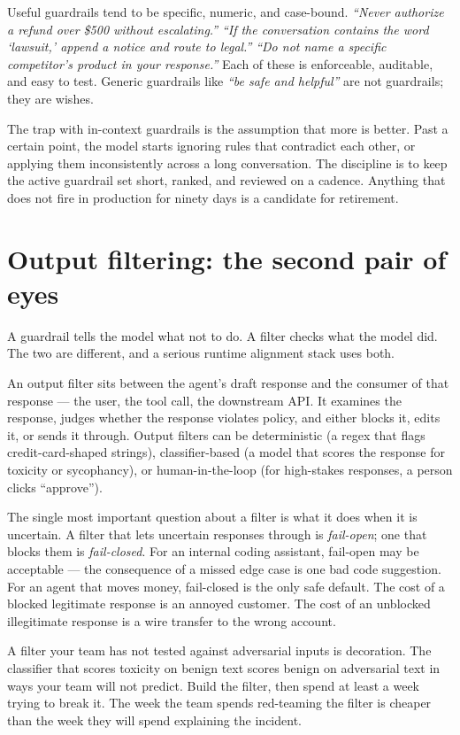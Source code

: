 Useful guardrails tend to be specific, numeric, and case-bound. \textit{``Never authorize a refund over \$500 without escalating.''} \textit{``If the conversation contains the word `lawsuit,' append a notice and route to legal.''} \textit{``Do not name a specific competitor's product in your response.''} Each of these is enforceable, auditable, and easy to test. Generic guardrails like \textit{``be safe and helpful''} are not guardrails; they are wishes.

The trap with in-context guardrails is the assumption that more is better. Past a certain point, the model starts ignoring rules that contradict each other, or applying them inconsistently across a long conversation. The discipline is to keep the active guardrail set short, ranked, and reviewed on a cadence. Anything that does not fire in production for ninety days is a candidate for retirement.

\section{Output filtering: the second pair of eyes}

A guardrail tells the model what not to do. A filter checks what the model did. The two are different, and a serious runtime alignment stack uses both.

An output filter sits between the agent's draft response and the consumer of that response --- the user, the tool call, the downstream API. It examines the response, judges whether the response violates policy, and either blocks it, edits it, or sends it through. Output filters can be deterministic (a regex that flags credit-card-shaped strings), classifier-based (a model that scores the response for toxicity or sycophancy), or human-in-the-loop (for high-stakes responses, a person clicks ``approve'').

The single most important question about a filter is what it does when it is uncertain. A filter that lets uncertain responses through is \textit{fail-open}; one that blocks them is \textit{fail-closed}. For an internal coding assistant, fail-open may be acceptable --- the consequence of a missed edge case is one bad code suggestion. For an agent that moves money, fail-closed is the only safe default. The cost of a blocked legitimate response is an annoyed customer. The cost of an unblocked illegitimate response is a wire transfer to the wrong account.

\begin{TNwarning} A filter your team has not tested against adversarial inputs is decoration. The classifier that scores toxicity on benign text scores benign on adversarial text in ways your team will not predict. Build the filter, then spend at least a week trying to break it. The week the team spends red-teaming the filter is cheaper than the week they will spend explaining the incident. \end{TNwarning}

